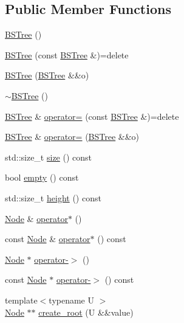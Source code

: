 \subsection*{Public Member Functions}
\begin{DoxyCompactItemize}
\item 
\hyperlink{classBSTree_a4bdc6f7fed9c195675c2f8b0ebe6fc26}{B\+S\+Tree} ()
\item 
\hyperlink{classBSTree_a9e4b4529c80eea07260e73a0e2d4b448}{B\+S\+Tree} (const \hyperlink{classBSTree}{B\+S\+Tree} \&)=delete
\item 
\hyperlink{classBSTree_a3cc07ee6021bdf3094b2e69cb235eb49}{B\+S\+Tree} (\hyperlink{classBSTree}{B\+S\+Tree} \&\&o)
\item 
\hyperlink{classBSTree_a54457f700c5237425ebb3006b4306cb2}{$\sim$\+B\+S\+Tree} ()
\item 
\hyperlink{classBSTree}{B\+S\+Tree} \& \hyperlink{classBSTree_ac28ab11cb87c12f7338d0f5e1194fb5f}{operator=} (const \hyperlink{classBSTree}{B\+S\+Tree} \&)=delete
\item 
\hyperlink{classBSTree}{B\+S\+Tree} \& \hyperlink{classBSTree_a78c19a61f102ec3999ed62076651b9cb}{operator=} (\hyperlink{classBSTree}{B\+S\+Tree} \&\&o)
\item 
std\+::size\+\_\+t \hyperlink{classBSTree_a5a5453ddeb293754f7a5faf7a11ad066}{size} () const
\item 
bool \hyperlink{classBSTree_a4962f6576d06c47a12a94045b5c1efa8}{empty} () const
\item 
std\+::size\+\_\+t \hyperlink{classBSTree_ad8e76b92cb078260a0e16db55b0ddf00}{height} () const
\item 
\hyperlink{classBSTree_a9c1a06548b3ff425e1d906f17ce2c858}{Node} \& \hyperlink{classBSTree_a079e116466f53f9716387b5ac494f35e}{operator$\ast$} ()
\item 
const \hyperlink{classBSTree_a9c1a06548b3ff425e1d906f17ce2c858}{Node} \& \hyperlink{classBSTree_a59915c35b54e0cef2260759c1392d006}{operator$\ast$} () const
\item 
\hyperlink{classBSTree_a9c1a06548b3ff425e1d906f17ce2c858}{Node} $\ast$ \hyperlink{classBSTree_af16e2ebbb7e4b77039cd4733d0933311}{operator-\/$>$} ()
\item 
const \hyperlink{classBSTree_a9c1a06548b3ff425e1d906f17ce2c858}{Node} $\ast$ \hyperlink{classBSTree_a365c9985b08cb919c11dd91cdc3ef6ac}{operator-\/$>$} () const
\item 
{\footnotesize template$<$typename U $>$ }\\\hyperlink{classBSTree_a9c1a06548b3ff425e1d906f17ce2c858}{Node} $\ast$$\ast$ \hyperlink{classBSTree_ab708b6687e1e241e3b101b5a7d1cff01}{create\+\_\+root} (U \&\&value)
$$
\end{DoxyCompactItemize}
